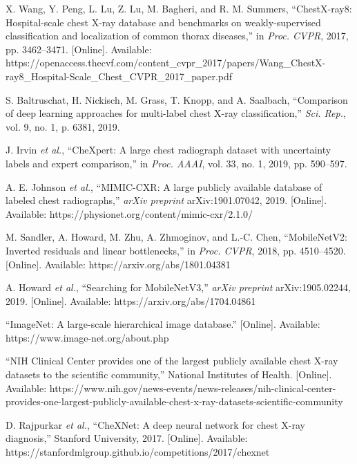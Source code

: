 \documentclass[12pt]{article}
\begin{document}
\begin{thebibliography}{99}
X. Wang, Y. Peng, L. Lu, Z. Lu, M. Bagheri, and R. M. Summers, “ChestX-ray8: Hospital-scale chest X-ray database and benchmarks on weakly-supervised classification and localization of common thorax diseases,” in \textit{Proc. CVPR}, 2017, pp. 3462–3471. [Online]. Available: https://openaccess.thecvf.com/content_cvpr_2017/papers/Wang_ChestX-ray8_Hospital-Scale_Chest_CVPR_2017_paper.pdf

S. Baltruschat, H. Nickisch, M. Grass, T. Knopp, and A. Saalbach, “Comparison of deep learning approaches for multi-label chest X-ray classification,” \textit{Sci. Rep.}, vol. 9, no. 1, p. 6381, 2019.

J. Irvin \textit{et al.}, “CheXpert: A large chest radiograph dataset with uncertainty labels and expert comparison,” in \textit{Proc. AAAI}, vol. 33, no. 1, 2019, pp. 590–597.

A. E. Johnson \textit{et al.}, “MIMIC-CXR: A large publicly available database of labeled chest radiographs,” \textit{arXiv preprint} arXiv:1901.07042, 2019. [Online]. Available: https://physionet.org/content/mimic-cxr/2.1.0/

M. Sandler, A. Howard, M. Zhu, A. Zhmoginov, and L.-C. Chen, “MobileNetV2: Inverted residuals and linear bottlenecks,” in \textit{Proc. CVPR}, 2018, pp. 4510–4520. [Online]. Available: https://arxiv.org/abs/1801.04381

A. Howard \textit{et al.}, “Searching for MobileNetV3,” \textit{arXiv preprint} arXiv:1905.02244, 2019. [Online]. Available: https://arxiv.org/abs/1704.04861

“ImageNet: A large-scale hierarchical image database.” [Online]. Available: https://www.image-net.org/about.php

“NIH Clinical Center provides one of the largest publicly available chest X-ray datasets to the scientific community,” National Institutes of Health. [Online]. Available: https://www.nih.gov/news-events/news-releases/nih-clinical-center-provides-one-largest-publicly-available-chest-x-ray-datasets-scientific-community

D. Rajpurkar \textit{et al.}, “CheXNet: A deep neural network for chest X-ray diagnosis,” Stanford University, 2017. [Online]. Available: https://stanfordmlgroup.github.io/competitions/2017/chexnet


\end{thebibliography}
\end{document}
